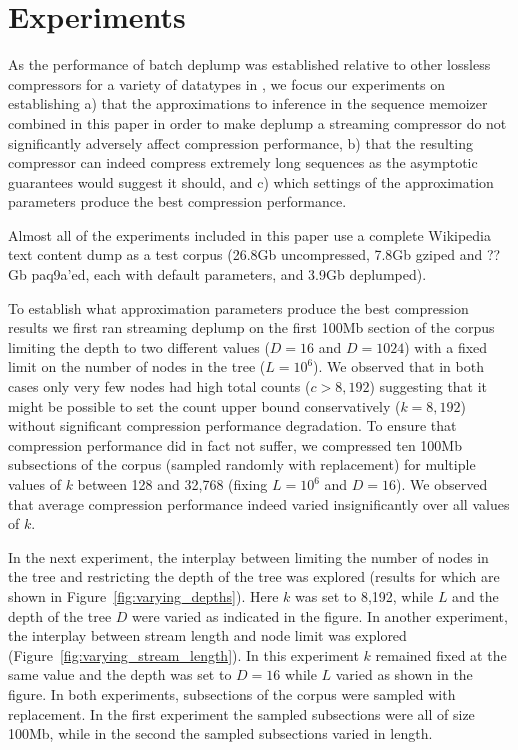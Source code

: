 \section{Experiments}
\label{sec:experiments}

As the performance of batch deplump was established relative to other lossless compressors for a variety of datatypes in \citep{Gasthaus2010}, we focus our experiments on establishing a) that the approximations to inference in the sequence memoizer combined in this paper in order to make deplump a streaming compressor do not significantly adversely affect compression performance, b) that the resulting compressor can indeed compress extremely long sequences as the asymptotic guarantees would suggest it should, and c) which settings of the approximation parameters produce the best compression performance.

Almost all of the experiments included in this paper use a complete Wikipedia text content dump \citep{Wikipedia2010} as a test corpus (26.8Gb uncompressed, 7.8Gb gziped and ??Gb paq9a'ed, each with default parameters, and 3.9Gb deplumped).  

To establish what approximation parameters produce the best compression results we first ran streaming deplump on the first 100Mb section of the corpus limiting the depth to two different values ($D=16$ and $D=1024$) with a fixed limit on the number of nodes in the tree ($L=10^6$).  We observed that in both cases only very few nodes had high total counts ($c > 8,192$) suggesting that it might be possible to set the count upper bound conservatively ($k= 8,192$) without significant compression performance degradation.  %
To ensure that compression performance did in fact not suffer, we compressed ten 100Mb subsections of the corpus (sampled randomly with replacement) for multiple values of $k$ between 128 and 32,768 (fixing $L=10^6$ and $D=16$).  We observed that average compression performance indeed varied insignificantly over all values of $k$.

  In the next experiment, the interplay between limiting the number of nodes in the tree and restricting the depth of the tree was explored (results for which are shown in Figure~\ref{fig:varying_depths}).  Here $k$ was set to 8,192, while $L$ and the depth of the tree $D$ were varied as indicated in the figure.  In another experiment, the interplay between stream length and node limit was explored (Figure~\ref{fig:varying_stream_length}).  In this experiment $k$ remained fixed at the same value and the depth was set to $D=16$ while $L$ varied as shown in the figure.  
 In both experiments, subsections of the corpus were sampled with replacement.  In the first experiment the sampled subsections were all of size 100Mb, while in the second the sampled subsections varied in length.

